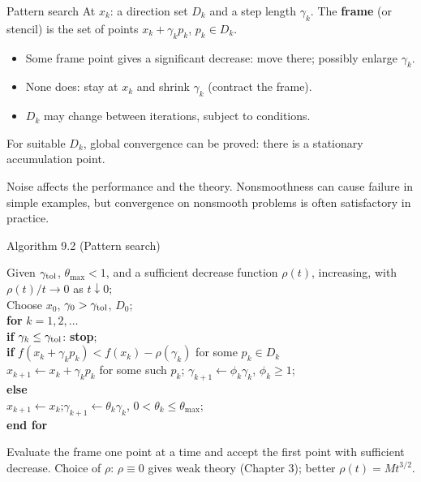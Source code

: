 \documentclass[12pt,aspectratio=169]{beamer}
\newcommand{\algblock}[1]{\begin{block}{}#1\end{block}}
\newcommand{\kw}[1]{\textbf{#1}}
\newcommand{\ind}{\hspace*{1.2em}}
\begin{document}
\begin{frame}{Pattern search}
  At $x_k$: a direction set $D_k$ and a step length $\gamma_k$.
  The \textbf{frame} (or stencil) is the set of points $x_k+\gamma_kp_k$, $p_k\in D_k$.
  \begin{itemize}
    \item Some frame point gives a significant decrease: move there; possibly enlarge $\gamma_k$.
    \item None does: stay at $x_k$ and shrink $\gamma_k$ (contract the frame).
    \item $D_k$ may change between iterations, subject to conditions.
  \end{itemize}
  For suitable $D_k$, global convergence can be proved: there is a stationary accumulation point.

  Noise affects the performance and the theory. Nonsmoothness can cause failure in simple examples,
  but convergence on nonsmooth problems is often satisfactory in practice.
\end{frame}

\begin{frame}{Algorithm 9.2 (Pattern search)}
  \algblock{
    Given $\gamma_{\rm tol}$, $\theta_{\max}<1$, and a sufficient decrease function $\rho(t)$,
    increasing, with $\rho(t)/t\to0$ as $t\downarrow0$;\\
    Choose $x_0$, $\gamma_0>\gamma_{\rm tol}$, $D_0$;\\
    \kw{for} $k=1,2,\dots$\\
    \ind \kw{if} $\gamma_k\le\gamma_{\rm tol}$: \kw{stop};\\
    \ind \kw{if} $f(x_k+\gamma_kp_k)<f(x_k)-\rho(\gamma_k)$ for some $p_k\in D_k$\\
    \ind\ind $x_{k+1}\leftarrow x_k+\gamma_kp_k$ for some such $p_k$;\quad
      $\gamma_{k+1}\leftarrow\phi_k\gamma_k$, $\phi_k\ge1$;\\
    \ind \kw{else}\\
    \ind\ind $x_{k+1}\leftarrow x_k$;\quad $\gamma_{k+1}\leftarrow\theta_k\gamma_k$, $0<\theta_k\le\theta_{\max}$;\\
    \kw{end for}
  }
  Evaluate the frame one point at a time and accept the first point with sufficient decrease.
  Choice of $\rho$: $\rho\equiv0$ gives weak theory (Chapter 3); better $\rho(t)=Mt^{3/2}$.
\end{frame}
\end{document}
